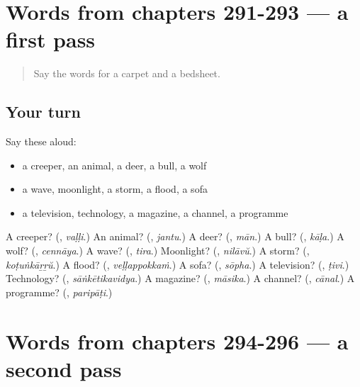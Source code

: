 \section[(dialogue)]{Words from chapters 291-293 — a first pass}

\label{lesson:ML-R296-first-pass-words-from-chapters-291-293}



\begin{quote}
Say the words for a carpet and a bedsheet.
\end{quote}

\subsection*{Your turn}
Say these aloud:

\begin{itemize}
\raggedright
  \item a creeper, an animal, a deer, a bull, a wolf
  \item a wave, moonlight, a storm, a flood, a sofa
  \item a television, technology, a magazine, a channel, a programme
\end{itemize}

\begin{tcolorbox}[breakable,colback=teal!4,colframe=teal!35!black,title={Before you move on}]
A creeper? (\textbf{}, \emph{vaḷḷi}.) An animal? (\textbf{}, \emph{jantu}.) A deer? (\textbf{}, \emph{mān}.) A bull? (\textbf{}, \emph{kāḷa}.) A wolf? (\textbf{}, \emph{cennāya}.) A wave? (\textbf{}, \emph{tira}.) Moonlight? (\textbf{}, \emph{nilāvŭ}.) A storm? (\textbf{}, \emph{koṭuṅkāṟṟŭ}.) A flood? (\textbf{}, \emph{veḷḷappokkaṁ}.) A sofa? (\textbf{}, \emph{sōpha}.) A television? (\textbf{}, \emph{ṭivi}.) Technology? (\textbf{}, \emph{sāṅkētikavidya}.) A magazine? (\textbf{}, \emph{māsika}.) A channel? (\textbf{}, \emph{cānal}.) A programme? (\textbf{}, \emph{paripāṭi}.)
\end{tcolorbox}
\section[(dialogue)]{Words from chapters 294-296 — a second pass}

\label{lesson:ML-R296-second-pass-words-from-chapters-294-296}



